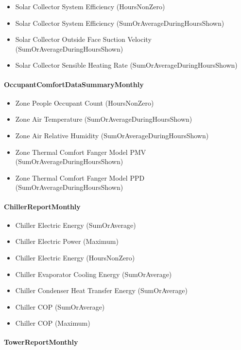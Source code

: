\begin{itemize}
\item
  Solar Collector System Efficiency (HoursNonZero)
\item
  Solar Collector System Efficiency (SumOrAverageDuringHoursShown)
\item
  Solar Collector Outside Face Suction Velocity (SumOrAverageDuringHoursShown)
\item
  Solar Collector Sensible Heating Rate (SumOrAverageDuringHoursShown)
\end{itemize}

\paragraph{OccupantComfortDataSummaryMonthly}\label{occupantcomfortdatasummarymonthly}

\begin{itemize}
\item
  Zone People Occupant Count (HoursNonZero)
\item
  Zone Air Temperature (SumOrAverageDuringHoursShown)
\item
  Zone Air Relative Humidity (SumOrAverageDuringHoursShown)
\item
  Zone Thermal Comfort Fanger Model PMV (SumOrAverageDuringHoursShown)
\item
  Zone Thermal Comfort Fanger Model PPD (SumOrAverageDuringHoursShown)
\end{itemize}

\paragraph{ChillerReportMonthly}\label{chillerreportmonthly}

\begin{itemize}
\item
  Chiller Electric Energy (SumOrAverage)
\item
  Chiller Electric Power (Maximum)
\item
  Chiller Electric Energy (HoursNonZero)
\item
  Chiller Evaporator Cooling Energy (SumOrAverage)
\item
  Chiller Condenser Heat Transfer Energy (SumOrAverage)
\item
  Chiller COP (SumOrAverage)
\item
  Chiller COP (Maximum)
\end{itemize}

\paragraph{TowerReportMonthly}\label{towerreportmonthly}


